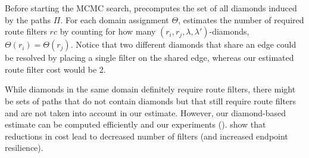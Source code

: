 Before  starting the MCMC search, \name precomputes
the set of all diamonds induced by the paths $\Pi$. 
For each
domain assignment $\Theta$,
\name estimates the number of required 
route filters $rc$ by counting for 
how many $(r_i, r_j, \lambda, \lambda')$-diamonds,
$\Theta(r_i) = \Theta(r_j)$. 
Notice that two different diamonds that share an edge could be resolved
by placing a single filter on the shared edge, whereas our estimated route filter cost 
would be 2. 

While diamonds in the same domain definitely require route filters, there might be
sets of paths that do not contain diamonds but that still require route filters
and are not
taken into account in our estimate. 
However, our diamond-based estimate
can be computed efficiently and 
our experiments  ().  show that reductions 
in cost lead to decreased number of filters
(and increased endpoint resilience).


